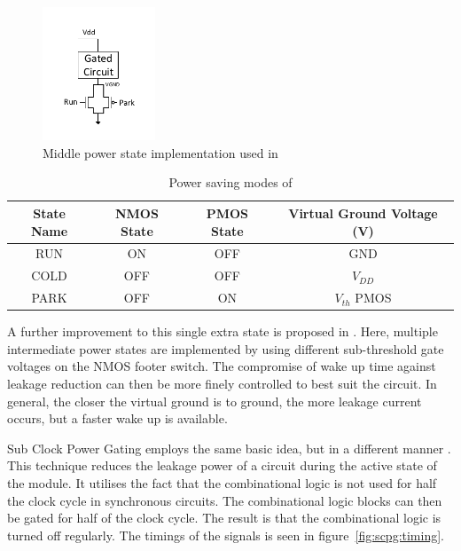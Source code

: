 \begin{figure}
\centering
\includegraphics[width=0.3\textwidth]{Figures/powergating_kim.pdf}
\caption{Middle power state implementation used in \cite{kim2004experimental}}
\label{fig:kim}
\end{figure}

\begin{table}
\caption{Power saving modes of \cite{kim2004experimental}}
\label{tab:kim}
\centering
\begin{tabular}{|c|c|c|c|}\hline
State Name & NMOS State & PMOS State & Virtual Ground Voltage (V)\\ \hline
RUN  & ON   & OFF  & GND \\
COLD & OFF  & OFF  & $V_{DD}$ \\
PARK & OFF  & ON   & $V_{th}$ PMOS \\ \hline
\end{tabular}
\end{table}

A further improvement to this single extra state is proposed in \cite{singh2007enhanced}. 
Here, multiple intermediate power states are implemented by using different sub-threshold gate voltages on the NMOS footer switch. 
The compromise of wake up time against leakage reduction can then be more finely controlled to best suit the circuit.
In general, the closer the virtual ground is to ground, the more leakage current occurs, but a faster wake up is available. 

Sub Clock Power Gating employs the same basic idea, but in a different manner \cite{mistry2011sub}.
This technique reduces the leakage power of a circuit during the active state of the module.
It utilises the fact that the combinational logic is not used for half the clock cycle in synchronous circuits.
The combinational logic blocks can then be gated for half of the clock cycle.
The result is that the combinational logic is turned off regularly. 
The timings of the signals is seen in figure~\ref{fig:scpg:timing}.

